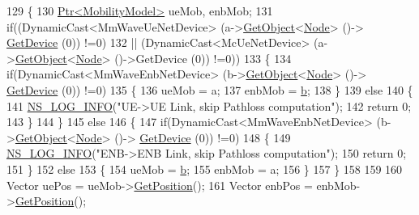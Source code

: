\begin{DoxyCode}
129 \{
130         \hyperlink{classns3_1_1Ptr}{Ptr<MobilityModel>} ueMob, enbMob;
131         \textcolor{keywordflow}{if}((DynamicCast<MmWaveUeNetDevice> (a->\hyperlink{classns3_1_1Object_a13e18c00017096c8381eb651d5bd0783}{GetObject}<\hyperlink{classns3_1_1Node}{Node}> ()->
      \hyperlink{classns3_1_1Node_a5918dfd24ef632efc9a83a5f6561c76e}{GetDevice} (0)) !=0)
132                 || (DynamicCast<McUeNetDevice> (a->\hyperlink{classns3_1_1Object_a13e18c00017096c8381eb651d5bd0783}{GetObject}<\hyperlink{classns3_1_1Node}{Node}> ()->GetDevice (0)) !=0))
133         \{
134                 \textcolor{keywordflow}{if}(DynamicCast<MmWaveEnbNetDevice> (b->\hyperlink{classns3_1_1Object_a13e18c00017096c8381eb651d5bd0783}{GetObject}<\hyperlink{classns3_1_1Node}{Node}> ()->
      \hyperlink{classns3_1_1Node_a5918dfd24ef632efc9a83a5f6561c76e}{GetDevice} (0)) !=0)
135                 \{
136                         ueMob = a;
137                         enbMob = \hyperlink{buildings__pathloss_8m_a21ad0bd836b90d08f4cf640b4c298e7c}{b};
138                 \}
139                 \textcolor{keywordflow}{else}
140                 \{
141                         \hyperlink{group__logging_gafbd73ee2cf9f26b319f49086d8e860fb}{NS\_LOG\_INFO}(\textcolor{stringliteral}{"UE->UE Link, skip Pathloss computation"});
142                         \textcolor{keywordflow}{return} 0;
143                 \}
144         \}
145         \textcolor{keywordflow}{else}
146         \{
147                 \textcolor{keywordflow}{if}(DynamicCast<MmWaveEnbNetDevice> (b->\hyperlink{classns3_1_1Object_a13e18c00017096c8381eb651d5bd0783}{GetObject}<\hyperlink{classns3_1_1Node}{Node}> ()->
      \hyperlink{classns3_1_1Node_a5918dfd24ef632efc9a83a5f6561c76e}{GetDevice} (0)) !=0)
148                 \{
149                         \hyperlink{group__logging_gafbd73ee2cf9f26b319f49086d8e860fb}{NS\_LOG\_INFO}(\textcolor{stringliteral}{"ENB->ENB Link, skip Pathloss computation"});
150                         \textcolor{keywordflow}{return} 0;
151                 \}
152                 \textcolor{keywordflow}{else}
153                 \{
154                         ueMob = \hyperlink{buildings__pathloss_8m_a21ad0bd836b90d08f4cf640b4c298e7c}{b};
155                         enbMob = a;
156                 \}
157         \}
158 
159 
160         Vector uePos = ueMob->\hyperlink{classns3_1_1MobilityModel_aba838f06ec5bbb2d193d94b8c0e4abb4}{GetPosition}();
161         Vector enbPos = enbMob->\hyperlink{classns3_1_1MobilityModel_aba838f06ec5bbb2d193d94b8c0e4abb4}{GetPosition}();

\end{DoxyCode}
